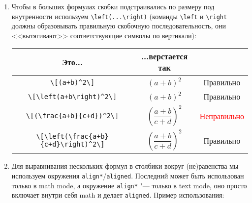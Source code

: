 \documentclass[12pt,a4paper]{book}
\newcommand{\ok}{& \textcolor{green!60!black}{Правильно}}
\newcommand{\bad}{& \textcolor{red}{Неправильно}}
\begin{document}
\begin{enumerate}
\item
	Чтобы в больших формулах скобки подстраивались по размеру под внутренности
	используем \verb'\left(...\right)'
	(команды \verb'\left' и \verb'\right' должны образовывать правильную скобочную последовательность,
	они <<вытягивают>> соответствующие символы по вертикали):
	\begin{center}\begin{tabular}{|c|c|c|}
		\hline Это... & ...верстается так & \\
		\hline \verb'\[(a+b)^2\]'                        & \begin{minipage}{3cm}\[(a+b)^2\]\end{minipage} \ok \\
		\hline \verb'\[\left(a+b\right)^2\]'             & \begin{minipage}{3cm}\[\left(a+b\right)^2\]\end{minipage} \ok \\
		\hline \verb'\[(\frac{a+b}{c+d})^2\]'            & \begin{minipage}{3cm}\[(\frac{a+b}{c+d})^2\]\end{minipage} \bad \\
		\hline \verb'\[\left(\frac{a+b}{c+d}\right)^2\]' & \begin{minipage}{3cm}\[\left(\frac{a+b}{c+d}\right)^2\]\end{minipage} \ok \\
		\hline
	\end{tabular}\end{center}

\item
	Для выравнивания нескольких формул в столбики вокруг (не)равенства
	мы используем окружения \texttt{align*}/\texttt{aligned}.
	Последний может быть использован только в math mode, а окружение \texttt{align*}
	"--- только в text mode, оно просто включает внутри себя math и делает \texttt{aligned}.
	Пример использования:


\end{enumerate}
\end{document}
